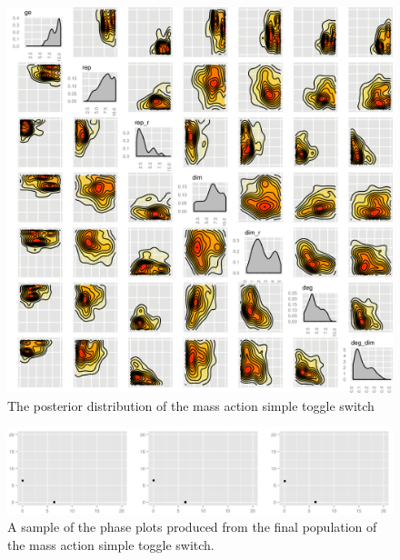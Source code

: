 \begin{figure}[p]
\centering
\includegraphics[scale=0.2]{chapterStabilityFinder/mass_action_switches/deterministic/posterior_ma_cl_bi.png}
\caption{The posterior distribution of the mass action simple toggle switch}
\label{fig:det_std}
\end{figure}

\begin{figure}[p]
\centering
\includegraphics[scale=0.3]{chapterStabilityFinder/mass_action_switches/deterministic/ma_cl_bi_phase_plot.png}
\caption{A sample of the phase plots produced from the final population of the mass action simple toggle switch.}
\label{fig:det_std_phase}
\end{figure}

